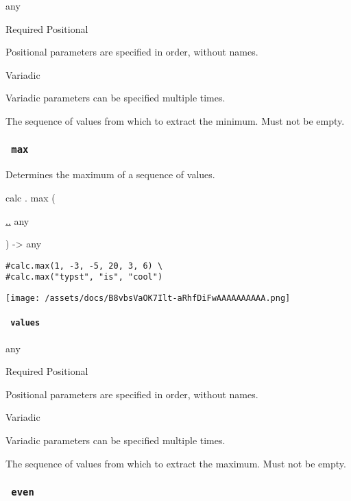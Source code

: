 { any }

{Required} {{ Positional }}

\label{functions-min-values-positional-tooltip}
Positional parameters are specified in order, without names.

{{ Variadic }}

\label{functions-min-values-variadic-tooltip}
Variadic parameters can be specified multiple times.

The sequence of values from which to extract the minimum. Must not be
empty.

\subsubsection{\texorpdfstring{\texttt{\ max\ }}{ max }}\label{functions-max}

Determines the maximum of a sequence of values.

calc { . } { max } (

{ \hyperref[functions-max-parameters-values]{..} { any } }

) -\textgreater{} { any }

\begin{verbatim}
#calc.max(1, -3, -5, 20, 3, 6) \
#calc.max("typst", "is", "cool")
\end{verbatim}

\texttt{[image: /assets/docs/B8vbsVaOK7Ilt-aRhfDiFwAAAAAAAAAA.png]}

\paragraph{\texorpdfstring{\texttt{\ values\ }}{ values }}\label{functions-max-values}

{ any }

{Required} {{ Positional }}

\label{functions-max-values-positional-tooltip}
Positional parameters are specified in order, without names.

{{ Variadic }}

\label{functions-max-values-variadic-tooltip}
Variadic parameters can be specified multiple times.

The sequence of values from which to extract the maximum. Must not be
empty.

\subsubsection{\texorpdfstring{\texttt{\ even\ }}{ even }}\label{functions-even}

